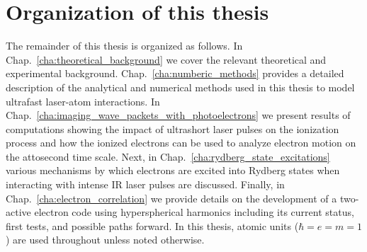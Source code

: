\section{Organization of this thesis} %
\label{sec:organization_of_this_thesis}

The remainder of this thesis is organized as follows. In Chap.~\ref{cha:theoretical_background} we cover the relevant theoretical and experimental background. Chap.~\ref{cha:numberic_methods} provides a detailed description of the analytical and numerical methods used in this thesis to model ultrafast laser-atom interactions. In Chap.~\ref{cha:imaging_wave_packets_with_photoelectrons} we present results of computations showing the impact of ultrashort laser pulses on the ionization process and how the ionized electrons can be used to analyze electron motion on the attosecond time scale. Next, in Chap.~\ref{cha:rydberg_state_excitations} various mechanisms by which electrons are excited into Rydberg states when interacting with intense IR laser pulses are discussed. Finally, in Chap.~\ref{cha:electron_correlation} we provide details on the development of a two-active electron code using hyperspherical harmonics including its current status, first tests, and possible paths forward.
In this thesis, atomic units ($\hbar=e=m=1$) are used throughout unless noted otherwise.
